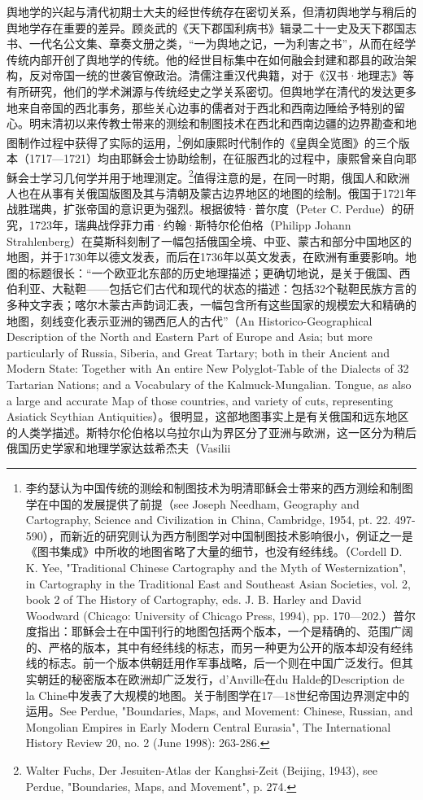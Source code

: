 \documentclass[a4paper, 12pt, openright]{ctexbook}
\begin{document}
舆地学的兴起与清代初期士大夫的经世传统存在密切关系，但清初舆地学与稍后的舆地学存在重要的差异。顾炎武的《天下郡国利病书》辑录二十一史及天下郡国志书、一代名公文集、章奏文册之类，“一为舆地之记，一为利害之书”，从而在经学传统内部开创了舆地学的传统。他的经世目标集中在如何融会封建和郡县的政治架构，反对帝国一统的世袭官僚政治。清儒注重汉代典籍，对于《汉书·地理志》等有所研究，他们的学术渊源与传统经史之学关系密切。但舆地学在清代的发达更多地来自帝国的西北事务，那些关心边事的儒者对于西北和西南边陲给予特别的留心。明末清初以来传教士带来的测绘和制图技术在西北和西南边疆的边界勘查和地图制作过程中获得了实际的运用，\footnote{李约瑟认为中国传统的测绘和制图技术为明清耶稣会士带来的西方测绘和制图学在中国的发展提供了前提（see Joseph Needham, Geography and Cartography, Science and Civilization in China, Cambridge, 1954, pt. 22. 497-590），而新近的研究则认为西方制图学对中国制图技术影响很小，例证之一是《图书集成》中所收的地图省略了大量的细节，也没有经纬线。（Cordell D. K. Yee, "Traditional Chinese Cartography and the Myth of Westernization", in Cartography in the Traditional East and Southeast Asian Societies, vol. 2, book 2 of The History of Cartography, eds. J. B. Harley and David Woodward (Chicago: University of Chicago Press, 1994), pp. 170—202.）普尔度指出：耶稣会士在中国刊行的地图包括两个版本，一个是精确的、范围广阔的、严格的版本，其中有经纬线的标志，而另一种更为公开的版本却没有经纬线的标志。前一个版本供朝廷用作军事战略，后一个则在中国广泛发行。但其实朝廷的秘密版本在欧洲却广泛发行，d'Anville在du Halde的Description de la Chine中发表了大规模的地图。关于制图学在17—18世纪帝国边界测定中的运用。See Perdue, "Boundaries, Maps, and Movement: Chinese, Russian, and Mongolian Empires in Early Modern Central Eurasia", The International History Review 20, no. 2 (June 1998): 263-286.}例如康熙时代制作的《皇舆全览图》的三个版本（1717—1721）均由耶稣会士协助绘制，在征服西北的过程中，康熙曾亲自向耶稣会士学习几何学并用于地理测定。\footnote{Walter Fuchs, Der Jesuiten-Atlas der Kanghsi-Zeit (Beijing, 1943), see Perdue, "Boundaries, Maps, and Movement", p. 274.}值得注意的是，在同一时期，俄国人和欧洲人也在从事有关俄国版图及其与清朝及蒙古边界地区的地图的绘制。俄国于1721年战胜瑞典，扩张帝国的意识更为强烈。根据彼特·普尔度（Peter C. Perdue）的研究，1723年，瑞典战俘菲力甫·约翰·斯特尔伦伯格（Philipp Johann Strahlenberg）在莫斯科刻制了一幅包括俄国全境、中亚、蒙古和部分中国地区的地图，并于1730年以德文发表，而后在1736年以英文发表，在欧洲有重要影响。地图的标题很长：“一个欧亚北东部的历史地理描述；更确切地说，是关于俄国、西伯利亚、大鞑靼——包括它们古代和现代的状态的描述：包括32个鞑靼民族方言的多种文字表；喀尔木蒙古声韵词汇表，一幅包含所有这些国家的规模宏大和精确的地图，刻线变化表示亚洲的锡西厄人的古代”（An Historico-Geographical Description of the North and Eastern Part of Europe and Asia; but more particularly of Russia, Siberia, and Great Tartary; both in their Ancient and Modern State: Together with An entire New Polyglot-Table of the Dialects of 32 Tartarian Nations; and a Vocabulary of the Kalmuck-Mungalian. Tongue, as also a large and accurate Map of those countries, and variety of cuts, representing Asiatick Scythian Antiquities）。很明显，这部地图事实上是有关俄国和远东地区的人类学描述。斯特尔伦伯格以乌拉尔山为界区分了亚洲与欧洲，这一区分为稍后俄国历史学家和地理学家达兹希杰夫（Vasilii 
\end{document}
